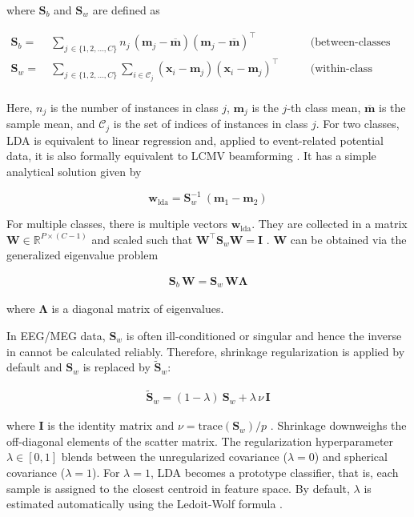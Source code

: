 \documentclass[utf8]{frontiersSCNS} %
\newcommand{\m}{\mathbf{m}}
\newcommand{\mbar}{\overline{\m}}
\newcommand{\mm}[1]{\m_{#1}}
\newcommand{\w}{\mathbf{w}}
\newcommand{\x}{\mathbf{x}}
\newcommand{\I}{\mathbf{I}}
\newcommand{\R}{\mathbb{R}}
\renewcommand{\S}{\mathbf{S}}
\newcommand{\W}{\mathbf{W}}
\begin{document}
where $\S_b$ and $\S_w$ are defined as

\begin{equation*}
\begin{alignedat}{2}
\S_b =\ & \sum_{j\,\in\{1,2,...,C\}}n_j\,(\mm{j} -\mbar) (\mm{j} - \mbar)^\top\ \quad &&\text{(between-classes scatter)}\\
\S_w =\ & \sum_{j\,\in\{1,2,...,C\}}\sum_{i\in\mathcal{C}_j} (\x_i - \mm{j})(\x_i - \mm{j})^\top\  \quad &&\text{(within-class scatter)}\\
\end{alignedat}
\end{equation*}

Here, $n_j$ is the number of instances in class $j$, $\m_j$ is the $j$-th class mean, $\mbar$ is the sample mean, and $\mathcal{C}_j$ is the set of indices of instances in class $j$. For two classes, LDA is equivalent to linear regression \citep{Treder2019DirectFDA} and, applied to event-related potential data, it is also formally equivalent to LCMV beamforming \citep{Treder2016}. It has a simple analytical solution given by

\begin{equation}
\label{eq:lda_solution}
\w_{\text{lda}} = \S_w^{-1}\ (\m_1 - \m_2)
\end{equation}

For multiple classes, there is multiple vectors $\w_{\text{lda}}$. They are collected in a matrix $\W\in\R^{P\times(C-1)}$ and scaled such that $\W^\top\S_w\W = \I$ \citep{Bishop2007}. $\W$ can be obtained via the generalized eigenvalue problem

\begin{align}
\label{eq:LDA-eigenvalue-multiclass}
\S_b\,\W = \S_w\,\W\mathbf{\Lambda}
\end{align}

where $\mathbf{\Lambda}$ is a diagonal matrix of eigenvalues.

In EEG/MEG data, $\S_w$ is often ill-conditioned or singular and hence the inverse in  cannot be calculated reliably. Therefore, shrinkage regularization is applied by default and $\S_w$ is replaced by $\widetilde{\S}_w$:

\begin{align}
\label{eq:shrinkage}
\widetilde{\S}_w = (1-\lambda)\ \S_w + \lambda\,\nu\,\I
\end{align}

where $\I$ is the identity matrix and $\nu = \text{trace}(\S_w)/p$ \citep{Blankertz2011}. Shrinkage downweighs the off-diagonal elements of the scatter matrix. The regularization hyperparameter $\lambda\in [0,1]$ blends between the unregularized covariance ($\lambda=0$) and spherical covariance ($\lambda=1$). For $\lambda=1$, LDA becomes a prototype classifier, that is, each sample is assigned to the closest centroid in feature space. By default, $\lambda$ is estimated automatically using the Ledoit-Wolf formula \citep{Ledoit2003HoneyMatrix,Blankertz2011}.
\end{document}
